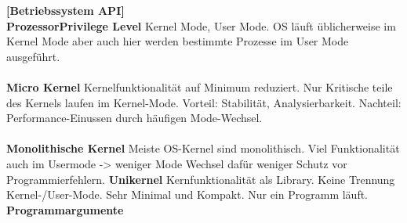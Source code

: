 \documentclass[8pt]{extarticle}
\let\oldtextbf\textbf
\renewcommand{\textbf}{\tiny\oldtextbf}
\begin{document}
\begin{multicols*}{5}
	\textbf{[Betriebssystem API]}\\
	\textbf{ProzessorPrivilege Level}
	Kernel Mode, User Mode. OS läuft üblicherweise im Kernel Mode aber auch hier werden bestimmte Prozesse im User Mode ausgeführt.\\\\
	\textbf{Micro Kernel}
	Kernelfunktionalität auf Minimum reduziert. Nur Kritische teile des Kernels laufen im Kernel-Mode. Vorteil: Stabilität, Analysierbarkeit. Nachteil: Performance-Einussen durch häufigen Mode-Wechsel.\\\\
	\textbf{Monolithische Kernel}
	Meiste OS-Kernel sind monolithisch. Viel Funktionalität auch im Usermode -> weniger Mode Wechsel dafür weniger Schutz vor Programmierfehlern.
	\textbf{Unikernel}
	Kernfunktionalität als Library. Keine Trennung Kernel-/User-Mode. Sehr Minimal und Kompakt. Nur ein Programm läuft.\\
	\textbf{Programmargumente}
		

\end{multicols*}
\end{document}
